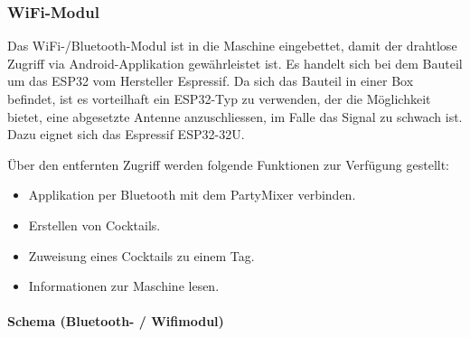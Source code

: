 \subsubsection{WiFi-Modul}
\label{subsubsec:ESP}


Das WiFi-/Bluetooth-Modul ist in die Maschine eingebettet, damit der drahtlose Zugriff via Android-Applikation gewährleistet ist. Es handelt sich bei dem Bauteil um das ESP32 vom Hersteller Espressif. Da sich das Bauteil in einer Box befindet, ist es vorteilhaft ein ESP32-Typ zu verwenden, der die Möglichkeit bietet, eine abgesetzte Antenne anzuschliessen, im Falle das Signal zu schwach ist. Dazu eignet sich das Espressif ESP32-32U.

Über den entfernten Zugriff werden folgende Funktionen zur Verfügung gestellt:
\begin{itemize}
\item Applikation per Bluetooth mit dem PartyMixer verbinden.
\item Erstellen von Cocktails.
\item Zuweisung eines Cocktails zu einem Tag.
\item Informationen zur Maschine lesen.
\end{itemize}

%

\paragraph{Schema (Bluetooth- / Wifimodul)}\mbox{}

